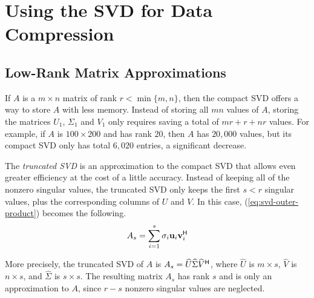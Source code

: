 \section*{Using the SVD for Data Compression} %

\subsection*{Low-Rank Matrix Approximations} %

If $A$ is a $m\times n$ matrix of rank $r < \min\{m,n\}$, then the compact SVD offers a way to store $A$ with less memory.
Instead of storing all $mn$ values of $A$, storing the matrices $U_1$, $\Sigma_1$ and $V_1$ only requires saving a total of $mr+r+nr$ values.
For example, if $A$ is $100 \times 200$ and has rank $20$, then $A$ has $20,000$ values, but its compact SVD only has total $6,020$ entries, a significant decrease.

The \emph{truncated SVD} is an approximation to the compact SVD that allows even greater efficiency at the cost of a little accuracy.
Instead of keeping all of the nonzero singular values, the truncated SVD only keeps the first $s < r$ singular values, plus the corresponding columns of $U$ and $V$.
In this case, (\ref{eq:svd-outer-product}) becomes the following.
%
\begin{equation*}
A_s = \sum_{i=1}^s \sigma_i\mathbf{u}_i\mathbf{v}^{\mathsf H}_i
\end{equation*}

More precisely, the truncated SVD of $A$ is $A_s = \widehat{U}\widehat{\Sigma} \widehat{V}^{\mathsf H}$, where
$\widehat{U}$ is $m\times s$, $\widehat{V}$ is $n \times s$, and $\widehat{\Sigma}$ is $s\times s$.
The resulting matrix $A_s$ has rank $s$ and is only an approximation to $A$, since $r - s$ nonzero singular values are neglected.

